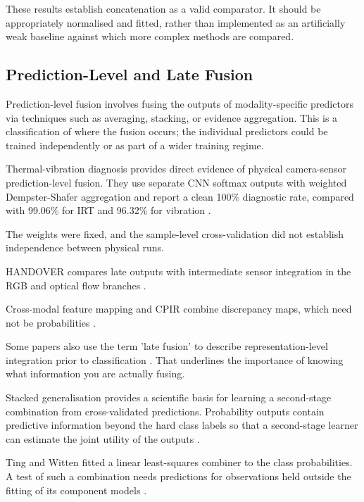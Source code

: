 These results establish concatenation as a valid comparator. It should be appropriately normalised
and fitted, rather than implemented as an artificially weak baseline against which more complex
methods are compared.

\subsection{Prediction-Level and Late Fusion}

Prediction-level fusion involves fusing the outputs of modality-specific predictors via techniques
such as averaging, stacking, or evidence aggregation. This is a classification of where the fusion
occurs; the individual predictors could be trained independently or as part of a wider training
regime.

Thermal-vibration diagnosis provides direct evidence of physical camera-sensor prediction-level
fusion. They use separate CNN softmax outputs with weighted Dempster-Shafer aggregation and report a
clean 100\% diagnostic rate, compared with 99.06\% for IRT and 96.32\% for vibration \parencite[Table~VII]{huo_multisensor_2022}.

The weights were fixed, and the sample-level cross-validation did not establish independence between
physical runs.

HANDOVER compares late outputs with intermediate sensor integration in the RGB and optical flow
branches \parencite[pp.~5--7]{thoduka_multimodal_2024}.

Cross-modal feature mapping and CPIR combine discrepancy maps, which need not be probabilities
\parencite{costanzino_multimodal_2024,shangguan_cpir_2025}.

Some papers also use the term 'late fusion' to describe representation-level integration prior to
classification \parencite{wang_what_2020}. That underlines the importance of knowing
what information you are actually fusing.

Stacked generalisation provides a scientific basis for learning a second-stage combination from
cross-validated predictions. Probability outputs contain predictive information beyond the hard
class labels so that a second-stage learner can estimate the joint utility of the outputs
\parencite[Sections~2--3]{ting_issues_1999}.

Ting and Witten fitted a linear least-squares combiner to the class probabilities. A test of such a combination needs predictions for observations held outside the fitting of its component models \parencite[Sections~2--3]{ting_issues_1999}.

